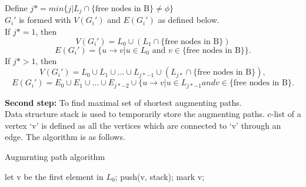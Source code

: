 \documentclass[11pt]{beamer}
\theoremstyle{definition}
\begin{document}
\begin{frame}


Define $j* = min\{j | L_j \cap \{\mbox{free nodes in B}\} \neq \phi\}$\\
$G_i'$ is formed with $V(G_i')$ and $E(G_i')$ as defined below.\\
If $j* = 1$, then 
	$$V(G_i') = L_0 \cup (L_1 \cap \mbox{\{free nodes in B\}})$$
	$$E(G_i') = \{u \rightarrow v | u \in L_0 \mbox{ and } v \in \{\mbox{free nodes in B}\}\}.$$
If $j* > 1$, then
	$$V(G_i') = L_0 \cup L_1 \cup ... \cup L_{j*-1} \cup (L_{j*} \cap \{\mbox{free nodes in 	B}\}),$$
	$$E(G_i') = E_0 \cup E_1 \cup ... \cup E_{j*-2} \cup \{u \rightarrow v | u \in L_{j*-1} and 	v \in \{\mbox{free nodes in B}\}.$$


\end{frame}

\begin{frame}
\textbf{Second step:} To find maximal set of shortest augmenting paths.\\
Data structure stack is used to temporarily store the augmenting paths. c-list of a vertex `v' is defined as all the vertices which are connected to `v' through an edge. The algorithm is as follows.
\end{frame}

\begin{algorithm}[H]
\begin{scriptsize}

\caption{Augmrnting path algorithm}
let v be the first element in $L_0$;
push(v, stack); mark v;\\
\end{scriptsize}
\end{algorithm}
\end{document}
